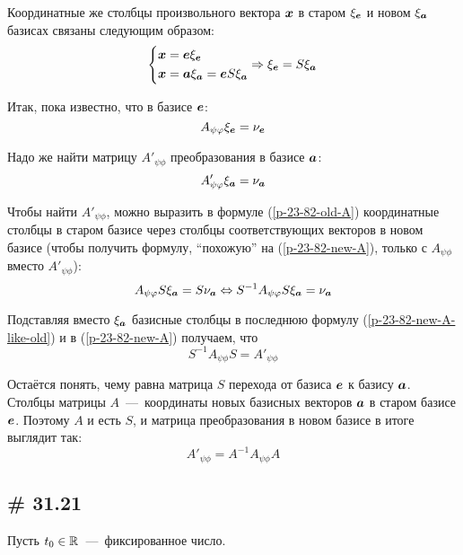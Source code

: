 \documentclass[a4paper,12pt]{article}
\begin{document}
\begin{solution}
    Координатные же столбцы произвольного вектора $\boldsymbol x$ в старом $\xi_{\boldsymbol e}$ и новом $\xi_{\boldsymbol a}$ базисах связаны следующим образом:
    \[
      \left\{
        \begin{aligned}
          &\boldsymbol x = \boldsymbol e \xi_{\boldsymbol e}\\
          &\boldsymbol x = \boldsymbol a \xi_{\boldsymbol a} = \boldsymbol e S \xi_{\boldsymbol a}\\
        \end{aligned}
        \Rightarrow \xi_{\boldsymbol e} = S \xi_{\boldsymbol a}
      \right.
    \]
    
    Итак, пока известно, что в базисе $\boldsymbol e$:
    \begin{equation}\label{p-23-82-old-A}
      A_{\psi \varphi} \xi_{\boldsymbol e} = \nu_{\boldsymbol e}
    \end{equation}
    
    Надо же найти матрицу $A'_{\psi\phi}$ преобразования в базисе $\boldsymbol a$:
    \begin{equation}\label{p-23-82-new-A}
      A'_{\psi\varphi} \xi_{\boldsymbol a} = \nu_{\boldsymbol a}
    \end{equation}
    
    Чтобы найти $A'_{\psi\phi}$, можно выразить в формуле (\ref{p-23-82-old-A}) координатные столбцы в старом базисе через столбцы соответствующих векторов в новом базисе (чтобы получить формулу, ``похожую'' на (\ref{p-23-82-new-A}), только с $A_{\psi\phi}$ вместо $A'_{\psi\phi}$):
    \begin{equation}\label{p-23-82-new-A-like-old}
      A_{\psi\varphi} S \xi_{\boldsymbol a} = S \nu_{\boldsymbol a}
      \Leftrightarrow S^{-1} A_{\psi\varphi} S \xi_{\boldsymbol a} = \nu_{\boldsymbol a}
    \end{equation}
    
    Подставляя вместо $\xi_{\boldsymbol a}$ базисные столбцы в последнюю формулу (\ref{p-23-82-new-A-like-old}) и в (\ref{p-23-82-new-A}) получаем, что
    \[
      S^{-1} A_{\psi\phi} S = A'_{\psi\phi}
    \]
    
    Остаётся понять, чему равна матрица $S$ перехода от базиса $\boldsymbol e$ к базису $\boldsymbol a$.
    Столбцы матрицы $A$~---~координаты новых базисных векторов $\boldsymbol a$ в старом базисе $\boldsymbol e$.
    Поэтому $A$ и есть $S$, и матрица преобразования в новом базисе в итоге выглядит так:
    \[
      A'_{\psi\phi} = A^{-1} A_{\psi\phi} A
    \]
  \end{solution}
  
  
  \subsection{\# 31.21}
  Пусть $t_0 \in \operatorname{\mathbb R}$~---~фиксированное число.
  
\end{document}
